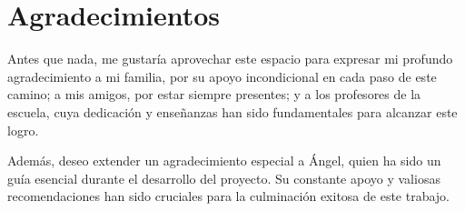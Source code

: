 \chapter*{Agradecimientos}
\thispagestyle{empty}

       \vspace{1cm}

Antes que nada, me gustaría aprovechar este espacio para expresar mi profundo agradecimiento a mi familia, por su apoyo incondicional en cada paso de este camino; a mis amigos, por estar siempre presentes; y a los profesores de la escuela, cuya dedicación y enseñanzas han sido fundamentales para alcanzar este logro.

Además, deseo extender un agradecimiento especial a Ángel, quien ha sido un guía esencial durante el desarrollo del proyecto. Su constante apoyo y valiosas recomendaciones han sido cruciales para la culminación exitosa de este trabajo.